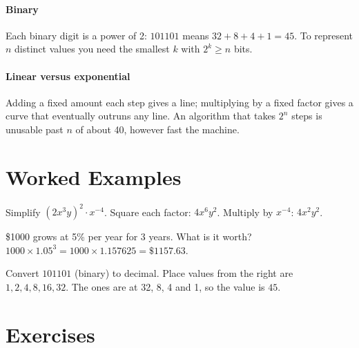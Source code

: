 \paragraph{Binary} Each binary digit is a power of 2: $101101$ means $32 + 8 + 4 + 1 = 45$. To represent $n$ distinct values you need the smallest $k$ with $2^k \ge n$ bits.

\paragraph{Linear versus exponential} Adding a fixed amount each step gives a line; multiplying by a fixed factor gives a curve that eventually outruns any line. An algorithm that takes $2^n$ steps is unusable past $n$ of about 40, however fast the machine.

\section{Worked Examples}

\begin{example}
Simplify $(2x^3 y)^2 \cdot x^{-4}$.
\solution Square each factor: $4x^6 y^2$. Multiply by $x^{-4}$: $4x^2 y^2$.
\end{example}

\begin{example}
\$1000 grows at 5\% per year for 3 years. What is it worth?
\solution $1000 \times 1.05^3 = 1000 \times 1.157625 = \$1157.63$.
\end{example}

\begin{example}
Convert $101101$ (binary) to decimal.
\solution Place values from the right are $1, 2, 4, 8, 16, 32$. The ones are at 32, 8, 4 and 1, so the value is $45$.
\end{example}

\section{Exercises}

